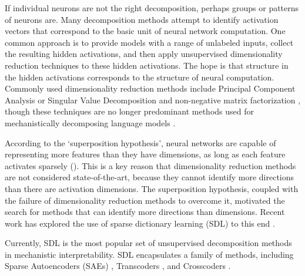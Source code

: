 \label{par:dim-reduction}

If individual neurons are not the right decomposition, perhaps groups or patterns of neurons are. Many decomposition methods attempt to identify activation vectors that correspond to the basic unit of neural network computation. One common approach is to provide models with a range of unlabeled inputs, collect the resulting hidden activations, and then apply unsupervised dimensionality reduction techniques to these hidden activations. The hope is that structure in the hidden activations corresponds to the structure of neural computation. Commonly used dimensionality reduction methods include Principal Component Analysis or Singular Value Decomposition \citep{Tigges_2023_Probe,marks2024geometrytruthemergentlinear,huang2024ravelevaluatinginterpretabilitymethods,bushnaq2024localinteractionbasisidentifying} and non-negative matrix factorization \citep{olah2018the,voss2021visualizing,cammarata2020curve}, though these techniques are no longer predominant methods used for mechanistically decomposing language models \citep{friedman2024interpretabilityillusionsgeneralizationsimplified}.

\label{par:sdl}

According to the `superposition hypothesis', neural networks are capable of representing more features than they have dimensions, as long as each feature activates sparsely \citep{elhage2021mathematical} (). This is a key reason that dimensionality reduction methods are not considered state-of-the-art, because they cannot identify more directions than there are activation dimensions. The superposition hypothesis, coupled with the failure of dimensionality reduction methods to overcome it, motivated the search for methods that can identify more directions than dimensions. Recent work has explored the use of sparse dictionary learning (SDL) to this end \citep{elhage2021mathematical,Sharkey_2022,cunningham2023sparseautoencodershighlyinterpretable,Bricken_2023_dictionary}.

Currently, SDL is the most popular set of unsupervised decomposition methods in mechanistic interpretability. SDL encapsulates a family of methods, including Sparse Autoencoders (SAEs) \citep{gao2024scalingevaluatingsparseautoencoders,templeton2024scaling, rajamanoharan2024improvingdictionarylearninggated, makelov2024principledevaluationssparseautoencoders, kissane2024interpretingattentionlayeroutputs, braun2024identifyingfunctionallyimportantfeatures}, Transcoders \citep{dunefsky2024transcodersinterpretablellmfeature}, and Crosscoders \citep{lindsey2024crosscoders}.


